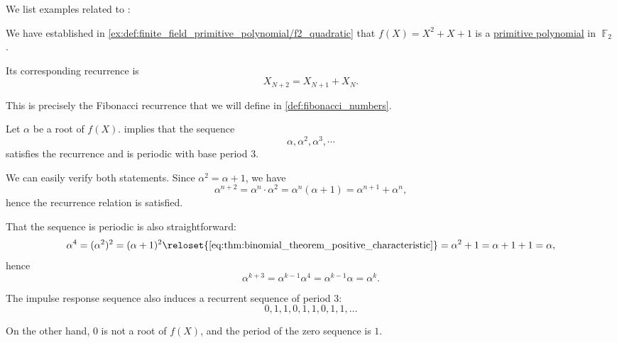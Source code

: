 \begin{example}\label{ex:thm:linear_recurrences_with_maximal_period}
  We list examples related to :
  \begin{thmenum}
     We have established in \cref{ex:def:finite_field_primitive_polynomial/f2_quadratic} that \( f(X) = X^2 + X + 1 \) is a \hyperref[def:finite_field_primitive_polynomial]{primitive polynomial} in \( \BbbF_2 \).

    Its corresponding recurrence is
    \begin{equation*}
      X_{N+2} = X_{N+1} + X_N.
    \end{equation*}

    This is precisely the Fibonacci recurrence that we will define in \cref{def:fibonacci_numbers}.

    Let \( \alpha \) be a root of \( f(X) \).  implies that the sequence
    \begin{equation*}
      \alpha, \alpha^2, \alpha^3, \cdots
    \end{equation*}
    satisfies the recurrence and is periodic with base period \( 3 \).

    We can easily verify both statements. Since \( \alpha^2 = \alpha + 1 \), we have
    \begin{equation*}
      \alpha^{n+2} = \alpha^n \cdot \alpha^2 = \alpha^n (\alpha + 1) = \alpha^{n+1} + \alpha^n,
    \end{equation*}
    hence the recurrence relation is satisfied.

    That the sequence is periodic is also straightforward:
    \begin{equation*}
      \alpha^4
      =
      (\alpha^2)^2
      =
      (\alpha + 1)^2
      \reloset {\eqref{eq:thm:binomial_theorem_positive_characteristic}} =
      \alpha^2 + 1
      =
      \alpha + 1 + 1
      =
      \alpha,
    \end{equation*}
    hence
    \begin{equation*}
      \alpha^{k+3}
      =
      \alpha^{k-1} \alpha^4
      =
      \alpha^{k-1} \alpha
      =
      \alpha^k.
    \end{equation*}

    The impulse response sequence also induces a recurrent sequence of period \( 3 \):
    \begin{equation*}
      0, 1, 1, 0, 1, 1, 0, 1, 1, \ldots
    \end{equation*}

    On the other hand, \( 0 \) is not a root of \( f(X) \), and the period of the zero sequence is \( 1 \).
  \end{thmenum}
\end{example}

